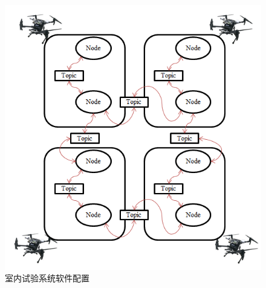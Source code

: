 \documentclass[lang=chs, degree=master, blindreview=false, winfonts=true]{yanputhesis}
\begin{document}
\begin{figure}[hbt!]
	\centering
	\includegraphics[width=30pc]{picture/ros.png} 
	\caption{室内试验系统软件配置} 
	\label{ros}
\end{figure}
\end{document}
